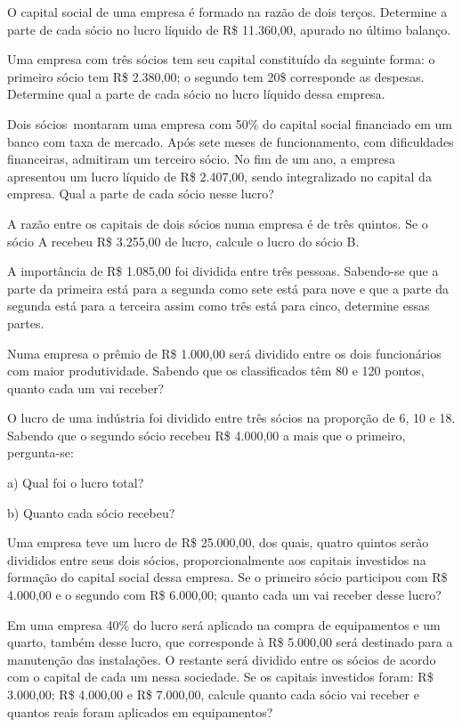 \begin{exercicios}

	\exitem{} O capital social de uma empresa é formado na razão de dois terços. Determine a parte de cada sócio no lucro líquido de R\$ 11.360,00, apurado no último balanço.

	\exitem{} Uma empresa com três sócios tem seu capital constituído da seguinte forma: o primeiro sócio tem R\$  2.380,00; o segundo tem 20\$  corresponde as despesas. Determine qual a parte de cada sócio no lucro líquido dessa empresa. 

	\exitem{} Dois sócios\  montaram uma empresa com 50\%  do capital social financiado em um banco com taxa de mercado. Após sete meses de funcionamento, com dificuldades financeiras, admitiram um terceiro sócio. No fim de um ano, a empresa apresentou um lucro líquido de R\$  2.407,00, sendo integralizado no capital da empresa. Qual a parte de cada sócio nesse lucro? 

	\exitem{} A razão entre os capitais de dois sócios numa empresa é de três quintos. Se o sócio A recebeu R\$ 3.255,00 de lucro, calcule o lucro do sócio B.

	\exitem{} A importância de R\$  1.085,00 foi dividida entre três pessoas. Sabendo-se que a parte da primeira está para a segunda como sete está para nove e que a parte da segunda está para a terceira assim como três está para cinco, determine essas partes.

	\exitem{} Numa empresa o prêmio de R\$  1.000,00 será dividido entre os dois funcionários com maior produtividade. Sabendo que os classificados têm 80 e 120 pontos, quanto cada um vai receber?

	\exitem{} O lucro de uma indústria foi dividido entre três sócios na proporção de 6, 10 e 18. Sabendo que o segundo sócio recebeu R\$  4.000,00 a mais que o primeiro, pergunta-se: 

	a) Qual foi o lucro total? 

	b) Quanto cada sócio recebeu?

	\exitem{}  Uma empresa teve um lucro de R\$  25.000,00, dos quais, quatro quintos serão divididos entre seus dois sócios, proporcionalmente aos capitais investidos na formação do capital social dessa empresa. Se o primeiro sócio participou com R\$  4.000,00 e o segundo com R\$  6.000,00; quanto cada um vai receber desse lucro?

	\exitem{} Em uma empresa 40\% do lucro será aplicado na compra de equipamentos e um quarto, também desse lucro, que corresponde à R\$ 5.000,00 será destinado para a manutenção das instalações. O restante será dividido entre os sócios de acordo com o capital de cada um nessa sociedade. Se os capitais investidos foram: R\$  3.000,00; R\$  4.000,00 e R\$  7.000,00, calcule quanto cada sócio vai receber e quantos reais foram aplicados em equipamentos? 


\end{exercicios}
